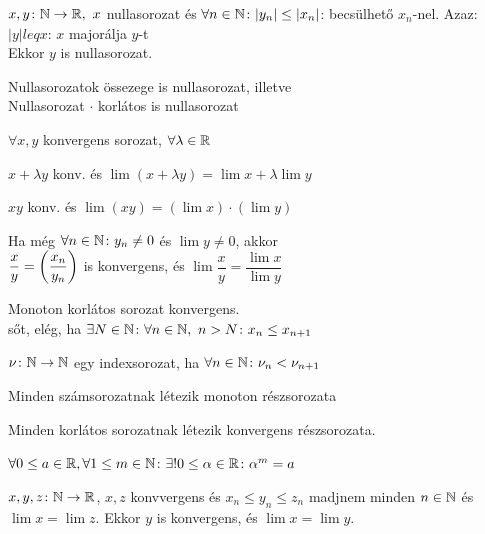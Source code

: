 \begin{te} $x,y\colon\mathbb{N}\to\mathbb{R},\ x$ nullasorozat
  és $\forall n\in\mathbb{N}\colon\vert y_n\vert\leq\vert x_n\vert$: becsülhető $x_n$-nel.
  Azaz: $\vert y\vert leq x$: $x$ majorálja $y$-t\\
Ekkor $y$ is nullasorozat.
\end{te}

\begin{te}Nullasorozatok össezege is nullasorozat, illetve\\
  Nullasorozat $\cdot$ korlátos is  nullasorozat
\end{te}
\begin{te}
  $\forall x,y$ konvergens sorozat, $\forall\lambda\in\mathbb{R}$
\begin{enumzjr}
\item $x+\lambda y$ konv. és $\lim(x+\lambda y)=\lim x+\lambda \lim y$
\item $xy$ konv. és $\lim(xy)=(\lim x)\cdot(\lim y)$
\item Ha még $\forall n\in\mathbb{N}\colon y_n\ne 0$  és $\lim y\ne 0$, akkor\\
  $\displaystyle\dfrac{x}{y}=\left(\dfrac{x_n}{y_n}\right)$ is konvergens, és $\lim\dfrac x y = \dfrac{\lim x}{\lim y}$
\end{enumzjr}
\end{te}
\begin{te}Monoton korlátos sorozat konvergens.\\
sőt, elég, ha $\exists N\in\mathbb{N}\colon \forall n\in\mathbb{N},\ n>N\colon x_n\leq x_{n+1}$
\end{te}
\begin{de}
  $\nu\colon\mathbb{N}\to\mathbb{N}$ egy indexsorozat, ha $\forall n\in\mathbb{N}\colon \nu_n<\nu_{n+1}$
\end{de}
\begin{te}Minden számsorozatnak létezik monoton részsorozata
\end{te}
\begin{te} Minden korlátos sorozatnak létezik konvergens részsorozata.
\end{te}

\begin{te}[Gyökvonás]$\forall 0\leq a\in\mathbb{R}, \forall 1\leq m\in \mathbb{N}$: $\exists!0\leq\alpha\in\mathbb{R}\colon \alpha^m=a$
\end{te}
\begin{te}$x,y,z\colon \mathbb{N}\to\mathbb{R}$, $x,z$ konvvergens és $x_n\leq y_n\leq z_n$ madjnem minden $n\in\mathbb{N}$ és 
$\lim x= \lim z$. Ekkor $y$ is konvergens, és $\lim x=\lim y$.
  \end{te}

